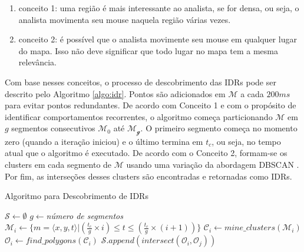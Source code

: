 \begin{enumerate}[label=\alph*)]
	\tightlist
	\item conceito 1: uma região é mais interessante ao analista, se for densa, ou seja, o analista movimenta seu mouse naquela região várias vezes.
	\item conceito 2: é possível que o analista movimente seu mouse em qualquer lugar do mapa. Isso não deve significar que todo lugar no mapa tem a mesma relevância.
\end{enumerate}

Com base nesses conceitos, o processo de descobrimento das IDRs pode ser descrito pelo Algoritmo \ref{algo:idr}. Pontos são adicionados em $\mathcal{M}$ a cada $200ms$ para evitar pontos redundantes. De acordo com Conceito 1 e com o propósito de identificar comportamentos recorrentes, o algoritmo começa particionando $\mathcal{M}$ em $g$ segmentos consecutivos $\mathcal{M_0}$ até $\mathcal{M_g}$. O primeiro segmento começa no momento zero (quando a iteração iniciou) e o último termina em $t_c$, ou seja, no tempo atual que o algoritmo é executado. De acordo com o Conceito 2, formam-se os clusters em cada segmento de $\mathcal{M}$ usando uma variação da abordagem DBSCAN \cite{Ester:1996}. Por fim, as interseções desses clusters são encontradas e retornadas como IDRs.

\begin{quadro}[]
	\centering
	\caption{Algoritmo para Descobrimento de IDRs}
	\label{algo:idr}
	\begin{algorithm}[H]
		\DontPrintSemicolon
		$\mathcal{S} \gets \emptyset$\;
		$g \gets ${\em número de segmentos}\;
		{
			   $\mathcal{M}_i \gets \{m = \langle x,y,t \rangle | (\frac{t_c}{g} \times i) \leq t \leq (\frac{t_c}{g} \times (i+1))\}$\;
			   $\mathcal{C}_i \gets \mathit{mine\_clusters}(\mathcal{M}_i)$\label{ln:mine}\;
			   $\mathcal{O}_i \gets \mathit{find\_polygons}(\mathcal{C}_i)$\label{ln:poly}\;
		}
		{
			   $\mathcal{S}.\mathit{append}(\mathit{intersect}(\mathcal{O}_i, \mathcal{O}_j))$
		}
		\; 
	\end{algorithm}
	\mfonte
\end{quadro}

